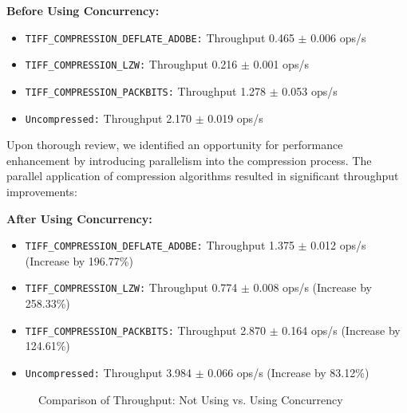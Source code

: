\documentclass[sigconf]{acmart}
\begin{document}
\textbf{Before Using Concurrency:}
\begin{itemize}
    \item \texttt{TIFF\_COMPRESSION\_DEFLATE\_ADOBE:} Throughput 0.465 $\pm$ 0.006 ops/s
    \item \texttt{TIFF\_COMPRESSION\_LZW:} Throughput 0.216 $\pm$ 0.001 ops/s
    \item \texttt{TIFF\_COMPRESSION\_PACKBITS:} Throughput 1.278 $\pm$ 0.053 ops/s
    \item \texttt{Uncompressed:} Throughput 2.170 $\pm$ 0.019 ops/s
\end{itemize}

Upon thorough review, we identified an opportunity for performance enhancement by introducing parallelism into the compression process. The parallel application of compression algorithms resulted in significant throughput improvements:\vspace{12pt}

\textbf{After Using Concurrency:}
\begin{itemize}
    \item \texttt{TIFF\_COMPRESSION\_DEFLATE\_ADOBE:} Throughput 1.375 $\pm$ 0.012 ops/s (Increase by 196.77\%)
    \item \texttt{TIFF\_COMPRESSION\_LZW:} Throughput 0.774 $\pm$ 0.008 ops/s (Increase by 258.33\%)
    \item \texttt{TIFF\_COMPRESSION\_PACKBITS:} Throughput 2.870 $\pm$ 0.164 ops/s (Increase by 124.61\%)
    \item \texttt{Uncompressed:} Throughput 3.984 $\pm$ 0.066 ops/s (Increase by 83.12\%)
\end{itemize}

\begin{figure}
  \centering
  \caption{Comparison of Throughput: Not Using vs. Using Concurrency}
  \label{fig:bargraph}
\end{figure}
\end{document}
